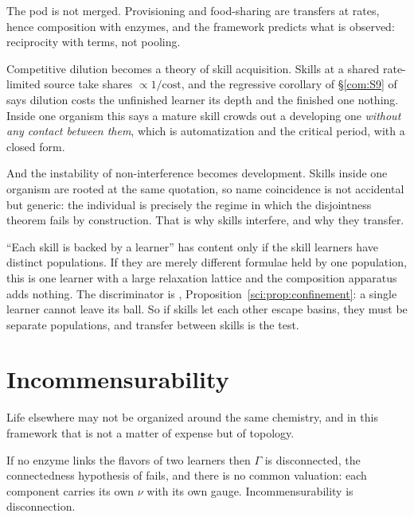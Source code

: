The pod is not merged. Provisioning and food-sharing are transfers at
rates, hence composition with enzymes, and the framework predicts what is
observed: reciprocity with terms, not pooling.

Competitive dilution becomes a theory of skill acquisition. Skills at a
shared rate-limited source take shares $\propto 1/\text{cost}$, and the
regressive corollary of \S\ref{com:S9} of \chComp says dilution costs the
unfinished learner its depth and the finished one nothing. Inside one
organism this says a mature skill crowds out a developing one \emph{without
any contact between them}, which is automatization and the critical period,
with a closed form.

And the instability of non-interference becomes development. Skills inside
one organism are rooted at the same quotation, so name coincidence is not
accidental but generic: the individual is precisely the regime in which the
disjointness theorem fails by construction. That is why skills interfere,
and why they transfer.

\begin{remark}\label{eng:orca-claim-empirical-definitional}
``Each skill is backed by a learner'' has content only if the skill
learners have distinct populations. If they are merely different formulae
held by one population, this is one learner with a large relaxation lattice
and the composition apparatus adds nothing. The discriminator is
\chSci, Proposition~\ref{sci:prop:confinement}: a single learner cannot leave its ball. So if
skills let each other escape basins, they must be separate populations, and
transfer between skills is the test.
\end{remark}

\section{Incommensurability}\label{eng:S10}
\label{eng:sec:incomm}

Life elsewhere may not be organized around the same chemistry, and in this
framework that is not a matter of expense but of topology.

\begin{proposition}\label{eng:no-engine-no-numeraire}
If no enzyme links the flavors of two learners then $\Gamma$ is
disconnected, the connectedness hypothesis of \cite[Thm.~3.3]{vtok} fails,
and there is no common valuation: each component carries its own $\nu$ with
its own gauge. Incommensurability is disconnection.
\end{proposition}

